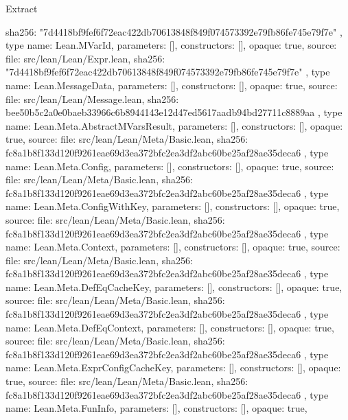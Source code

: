 \begin{lexlean}{Extract}
\begin{toolingmodule}
{{{        sha256: "7d4418bf9fef6f72eac422db70613848f849f074573392e79fb86fe745e79f7e"
      }
    },
    type{
      name: Lean.MVarId,
      parameters: [],
      constructors: [],
      opaque: true,
      source: {
        file: src/lean/Lean/Expr.lean,
        sha256: "7d4418bf9fef6f72eac422db70613848f849f074573392e79fb86fe745e79f7e"
      }
    },
    type{
      name: Lean.MessageData,
      parameters: [],
      constructors: [],
      opaque: true,
      source: {
        file: src/lean/Lean/Message.lean,
        sha256: bee50b5c2a0e0baeb33966c6b8944143e12d47ed5617aadb94bd27711c8889aa
      }
    },
    type{
      name: Lean.Meta.AbstractMVarsResult,
      parameters: [],
      constructors: [],
      opaque: true,
      source: {
        file: src/lean/Lean/Meta/Basic.lean,
        sha256: fc8a1b8f133d120f9261eae69d3ea372bfc2ea3df2abc60be25af28ae35deca6
      }
    },
    type{
      name: Lean.Meta.Config,
      parameters: [],
      constructors: [],
      opaque: true,
      source: {
        file: src/lean/Lean/Meta/Basic.lean,
        sha256: fc8a1b8f133d120f9261eae69d3ea372bfc2ea3df2abc60be25af28ae35deca6
      }
    },
    type{
      name: Lean.Meta.ConfigWithKey,
      parameters: [],
      constructors: [],
      opaque: true,
      source: {
        file: src/lean/Lean/Meta/Basic.lean,
        sha256: fc8a1b8f133d120f9261eae69d3ea372bfc2ea3df2abc60be25af28ae35deca6
      }
    },
    type{
      name: Lean.Meta.Context,
      parameters: [],
      constructors: [],
      opaque: true,
      source: {
        file: src/lean/Lean/Meta/Basic.lean,
        sha256: fc8a1b8f133d120f9261eae69d3ea372bfc2ea3df2abc60be25af28ae35deca6
      }
    },
    type{
      name: Lean.Meta.DefEqCacheKey,
      parameters: [],
      constructors: [],
      opaque: true,
      source: {
        file: src/lean/Lean/Meta/Basic.lean,
        sha256: fc8a1b8f133d120f9261eae69d3ea372bfc2ea3df2abc60be25af28ae35deca6
      }
    },
    type{
      name: Lean.Meta.DefEqContext,
      parameters: [],
      constructors: [],
      opaque: true,
      source: {
        file: src/lean/Lean/Meta/Basic.lean,
        sha256: fc8a1b8f133d120f9261eae69d3ea372bfc2ea3df2abc60be25af28ae35deca6
      }
    },
    type{
      name: Lean.Meta.ExprConfigCacheKey,
      parameters: [],
      constructors: [],
      opaque: true,
      source: {
        file: src/lean/Lean/Meta/Basic.lean,
        sha256: fc8a1b8f133d120f9261eae69d3ea372bfc2ea3df2abc60be25af28ae35deca6
      }
    },
    type{
      name: Lean.Meta.FunInfo,
      parameters: [],
      constructors: [],
      opaque: true,
}}
\end{toolingmodule}
\end{lexlean}
